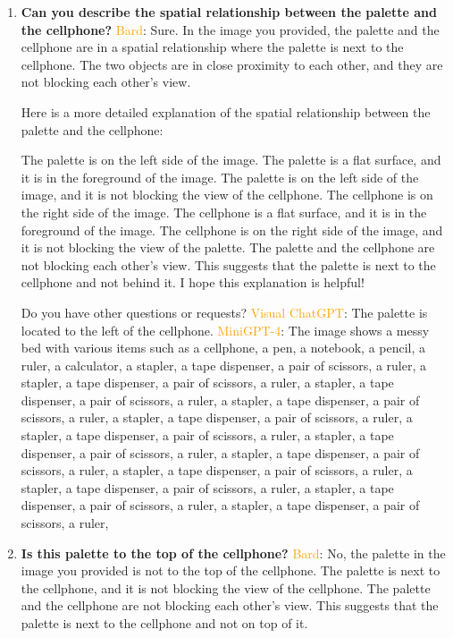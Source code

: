 \begin{enumerate}
    \item \textbf{Can you describe the spatial relationship between the palette and the cellphone?}
    \subitem \textcolor{orange}{Bard}: 
    Sure. In the image you provided, the palette and the cellphone are in a spatial relationship where the palette is next to the cellphone. The two objects are in close proximity to each other, and they are not blocking each other's view.
    
    Here is a more detailed explanation of the spatial relationship between the palette and the cellphone:
    
    The palette is on the left side of the image. The palette is a flat surface, and it is in the foreground of the image. The palette is on the left side of the image, and it is not blocking the view of the cellphone.
    The cellphone is on the right side of the image. The cellphone is a flat surface, and it is in the foreground of the image. The cellphone is on the right side of the image, and it is not blocking the view of the palette.
    The palette and the cellphone are not blocking each other's view. This suggests that the palette is next to the cellphone and not behind it.
    I hope this explanation is helpful!
    
    Do you have other questions or requests?
    \subitem \textcolor{orange}{Visual ChatGPT}: The palette is located to the left of the cellphone.
    \subitem \textcolor{orange}{MiniGPT-4}: The image shows a messy bed with various items such as a cellphone, a pen, a notebook, a pencil, a ruler, a calculator, a stapler, a tape dispenser, a pair of scissors, a ruler, a stapler, a tape dispenser, a pair of scissors, a ruler, a stapler, a tape dispenser, a pair of scissors, a ruler, a stapler, a tape dispenser, a pair of scissors, a ruler, a stapler, a tape dispenser, a pair of scissors, a ruler, a stapler, a tape dispenser, a pair of scissors, a ruler, a stapler, a tape dispenser, a pair of scissors, a ruler, a stapler, a tape dispenser, a pair of scissors, a ruler, a stapler, a tape dispenser, a pair of scissors, a ruler, a stapler, a tape dispenser, a pair of scissors, a ruler, a stapler, a tape dispenser, a pair of scissors, a ruler, a stapler, a tape dispenser, a pair of scissors, a ruler,
    \item \textbf{Is this palette to the top of the cellphone?}
    \subitem \textcolor{orange}{Bard}: No, the palette in the image you provided is not to the top of the cellphone. The palette is next to the cellphone, and it is not blocking the view of the cellphone. The palette and the cellphone are not blocking each other's view. This suggests that the palette is next to the cellphone and not on top of it.


\end{enumerate}
